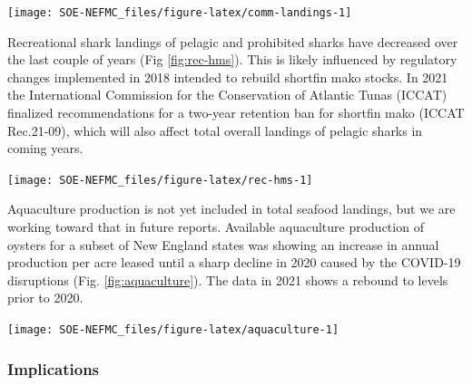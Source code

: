 \documentclass[
  10pt,
]{article}
\let\origfigure\figure
\let\endorigfigure\endfigure
\renewenvironment{figure}[1][2] {
    \expandafter\origfigure\expandafter[H]
} {
    \endorigfigure
}
\begin{document}
\begin{figure}

{\centering \texttt{[image: SOE-NEFMC\_files/figure-latex/comm-landings-1]} 

}

\caption{Total commercial landings (black) and NEFMC managed U.S seafood landings (red) by feeding guild for the Gulf of Maine.}\label{fig:comm-landings}
\end{figure}

Recreational shark landings of pelagic and prohibited sharks have decreased over the last couple of years (Fig \ref{fig:rec-hms}). This is likely influenced by regulatory changes implemented in 2018 intended to rebuild shortfin mako stocks. In 2021 the International Commission for the Conservation of Atlantic Tunas (ICCAT) finalized recommendations for a two-year retention ban for shortfin mako (ICCAT Rec.21-09), which will also affect total overall landings of pelagic sharks in coming years.

\begin{figure}

{\centering \texttt{[image: SOE-NEFMC\_files/figure-latex/rec-hms-1]} 

}

\caption{Recreational shark landings from Marine Recreational Information Program.}\label{fig:rec-hms}
\end{figure}

Aquaculture production is not yet included in total seafood landings, but we are working toward that in future reports. Available aquaculture production of oysters for a subset of New England states was showing an increase in annual production per acre leased until a sharp decline in 2020 caused by the COVID-19 disruptions (Fig. \ref{fig:aquaculture}). The data in 2021 shows a rebound to levels prior to 2020.

\begin{figure}

{\centering \texttt{[image: SOE-NEFMC\_files/figure-latex/aquaculture-1]} 

}

\caption{Total oyster production per acre leased for New England states.}\label{fig:aquaculture}
\end{figure}

\hypertarget{implications}{%
\subsubsection{Implications}\label{implications}}
\end{document}
